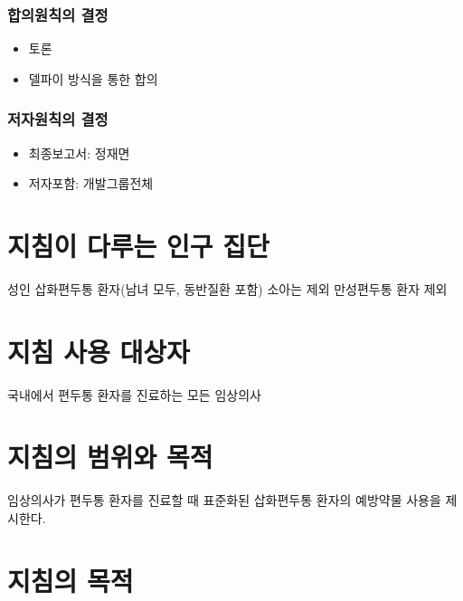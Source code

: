 \documentclass[]{book}
\providecommand{\tightlist}{%
  \setlength{\itemsep}{0pt}\setlength{\parskip}{0pt}}
\begin{document}
\hypertarget{section-37}{%
\subsubsection*{합의원칙의 결정}\label{section-37}}

\begin{itemize}
\tightlist
\item
  토론
\item
  델파이 방식을 통한 합의
\end{itemize}

\hypertarget{section-38}{%
\subsubsection*{저자원칙의 결정}\label{section-38}}

\begin{itemize}
\tightlist
\item
  최종보고서: 정재면
\item
  저자포함: 개발그룹전체
\end{itemize}

\hypertarget{section-39}{%
\section{지침이 다루는 인구 집단}\label{section-39}}

성인 삽화편두통 환자(남녀 모두, 동반질환 포함)
소아는 제외
만성편두통 환자 제외

\hypertarget{section-40}{%
\section{지침 사용 대상자}\label{section-40}}

국내에서 편두통 환자를 진료하는 모든 임상의사

\hypertarget{section-41}{%
\section{지침의 범위와 목적}\label{section-41}}

임상의사가 편두통 환자를 진료할 때 표준화된 삽화편두통 환자의 예방약물 사용을 제시한다.

\hypertarget{section-42}{%
\section{지침의 목적}\label{section-42}}
\end{document}
